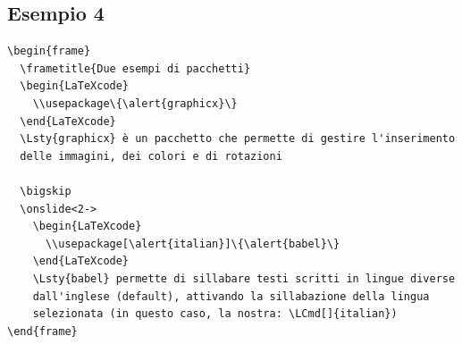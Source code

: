 \documentclass[a4paper,10pt]{article}
\begin{document}
\newpage
\subsection*{Esempio 4}\label{ex4}
\begin{Verbatim}
\begin{frame}
  \frametitle{Due esempi di pacchetti}
  \begin{LaTeXcode}
    \\usepackage\{\alert{graphicx}\}
  \end{LaTeXcode}
  \Lsty{graphicx} è un pacchetto che permette di gestire l'inserimento
  delle immagini, dei colori e di rotazioni

  \bigskip
  \onslide<2->
    \begin{LaTeXcode}
      \\usepackage[\alert{italian}]\{\alert{babel}\}
    \end{LaTeXcode}
    \Lsty{babel} permette di sillabare testi scritti in lingue diverse 
    dall'inglese (default), attivando la sillabazione della lingua
    selezionata (in questo caso, la nostra: \LCmd[]{italian})
\end{frame}
\end{Verbatim}

\bigskip
\begin{center}
\end{center}

\newpage
\end{document}
